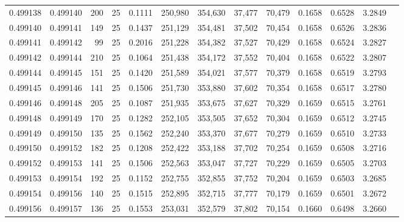 \begin{tabular}{rrrrrrrrrrrrr}
0.499138 & 0.499140 & 200 &  25 &                                     0.1111 & 250,980 & 354,630 &  37,477 &  70,479 & 0.1658 & 0.6528 & 3.2849 \\
0.499140 & 0.499141 & 149 &  25 &                                     0.1437 & 251,129 & 354,481 &  37,502 &  70,454 & 0.1658 & 0.6526 & 3.2836 \\
0.499141 & 0.499142 &  99 &  25 &                                     0.2016 & 251,228 & 354,382 &  37,527 &  70,429 & 0.1658 & 0.6524 & 3.2827 \\
0.499142 & 0.499144 & 210 &  25 &                                     0.1064 & 251,438 & 354,172 &  37,552 &  70,404 & 0.1658 & 0.6522 & 3.2807 \\
0.499144 & 0.499145 & 151 &  25 &                                     0.1420 & 251,589 & 354,021 &  37,577 &  70,379 & 0.1658 & 0.6519 & 3.2793 \\
0.499145 & 0.499146 & 141 &  25 &                                     0.1506 & 251,730 & 353,880 &  37,602 &  70,354 & 0.1658 & 0.6517 & 3.2780 \\
0.499146 & 0.499148 & 205 &  25 &                                     0.1087 & 251,935 & 353,675 &  37,627 &  70,329 & 0.1659 & 0.6515 & 3.2761 \\
0.499148 & 0.499149 & 170 &  25 &                                     0.1282 & 252,105 & 353,505 &  37,652 &  70,304 & 0.1659 & 0.6512 & 3.2745 \\
0.499149 & 0.499150 & 135 &  25 &                                     0.1562 & 252,240 & 353,370 &  37,677 &  70,279 & 0.1659 & 0.6510 & 3.2733 \\
0.499150 & 0.499152 & 182 &  25 &                                     0.1208 & 252,422 & 353,188 &  37,702 &  70,254 & 0.1659 & 0.6508 & 3.2716 \\
0.499152 & 0.499153 & 141 &  25 &                                     0.1506 & 252,563 & 353,047 &  37,727 &  70,229 & 0.1659 & 0.6505 & 3.2703 \\
0.499153 & 0.499154 & 192 &  25 &                                     0.1152 & 252,755 & 352,855 &  37,752 &  70,204 & 0.1659 & 0.6503 & 3.2685 \\
0.499154 & 0.499156 & 140 &  25 &                                     0.1515 & 252,895 & 352,715 &  37,777 &  70,179 & 0.1659 & 0.6501 & 3.2672 \\
0.499156 & 0.499157 & 136 &  25 &                                     0.1553 & 253,031 & 352,579 &  37,802 &  70,154 & 0.1660 & 0.6498 & 3.2660 \\

\end{tabular}
